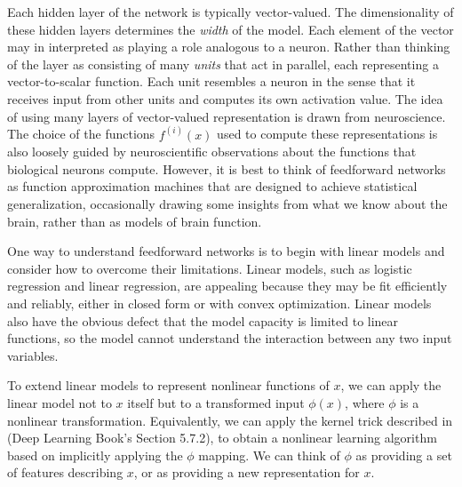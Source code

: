 \documentclass{report}
\begin{document}
\noindent Each hidden layer of the network is typically vector-valued. The dimensionality of these hidden layers determines the \textit{width} of the model. Each element of the vector may in interpreted as playing a role analogous to a neuron. Rather than thinking of the layer as consisting of many \textit{units} that act in parallel, each representing a vector-to-scalar function. Each unit resembles a neuron in the sense that it receives input from other units and computes its own activation value. The idea of using many layers of vector-valued representation is drawn from neuroscience. The choice of the functions $f^{(i)}(x)$ used to compute these representations is also loosely guided by neuroscientific observations about the functions that biological neurons compute. However, it is best to think of feedforward networks as function approximation machines that are designed to achieve statistical generalization, occasionally drawing some insights from what we know about the brain, rather than as models of brain function.\newline

\noindent One way to understand feedforward networks is to begin with linear models and consider how to overcome their limitations. Linear models, such as logistic regression and linear regression, are appealing because they may be fit efficiently and reliably, either in closed form or with convex optimization. Linear models also have the obvious defect that the model capacity is limited to linear functions, so the model cannot understand the interaction between any two input variables.\newline

\noindent To extend linear models to represent nonlinear functions of $x$, we can apply the linear model not to $x$ itself but to a transformed input $\phi(x)$, where $\phi$ is a nonlinear transformation. Equivalently, we can apply the kernel trick described in (Deep Learning Book's Section 5.7.2), to obtain a nonlinear learning algorithm based on implicitly applying the $\phi$ mapping. We can think of $\phi$ as providing a set of features describing $x$, or as providing a new representation for $x$.
\end{document}
